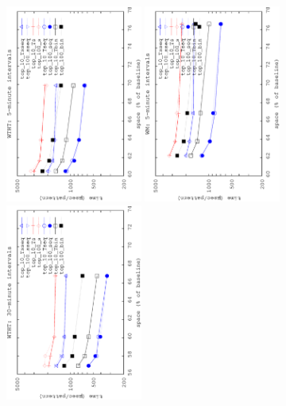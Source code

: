 	\begin{figure}[ht]
		\begin{center}
			{\includegraphics[angle=-90,width=0.4\textwidth]{figures_synt/madrid_st_topk_ht_5.eps}}
			{\includegraphics[angle=-90,width=0.4\textwidth]{figures_synt/madrid_st_topk_wm_5.eps}}
			{\includegraphics[angle=-90,width=0.4\textwidth]{figures_synt/madrid_st_topk_ht_30.eps}}

\end{center}
\end{figure}
